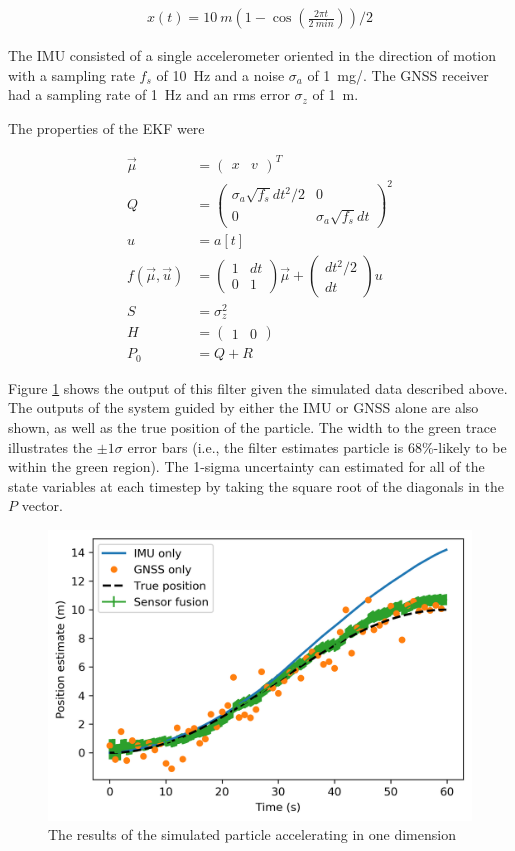 \documentclass[10pt]{article}
\begin{document}
\begin{align}
  x(t) = \SI{10}{m}\left(1 - \cos\left( \frac{2\pi t}{\SI{2}{min}}\right)\right) / 2
\end{align}

The IMU consisted of a single accelerometer oriented in the direction of motion with a sampling rate $f_s$ of \SI{10}{Hz} and a noise $\sigma_a$ of \SI{1}{mg/}. The GNSS receiver had a sampling rate of \SI{1}{Hz} and an rms error $\sigma_z$ of \SI{1}{m}.

The properties of the EKF were

\begin{align}
\vec{\mu} &= \begin{pmatrix} x & v \end{pmatrix}^T \\
  Q & = \begin{pmatrix}
    \sigma_a \sqrt{f_s} dt^2/2 & 0 \\
    0 & \sigma_a \sqrt{f_s} dt
  \end{pmatrix}^2 \\
  u &= a[t] \\
  f(\vec{\mu}, \vec{u}) &= \begin{pmatrix}
    1 & dt \\ 0 & 1
  \end{pmatrix} \vec{\mu} 
  + \begin{pmatrix} 
    dt^2/2 \\ dt
  \end{pmatrix} u
  \\
  S &= \sigma_z^2 \\ 
H &= \begin{pmatrix} 1 & 0 \end{pmatrix} \\
  P_0 &= Q + R
\end{align}

Figure \ref{fig:1d-accelerometer-results} shows the output of this filter given the simulated data described above. The outputs of the system guided by either the IMU or GNSS alone are also shown, as well as the true position of the particle. The width to the green trace illustrates the $\pm 1\sigma$ error bars (i.e., the filter estimates particle is 68\%-likely to be within the green region). The 1-sigma uncertainty can estimated for all of the state variables at each timestep by taking the square root of the diagonals in the $P$ vector. 

\begin{figure}[hbt]
  \centering
  \includegraphics[width=.5\textwidth]{../images/1d-accelerometer-simulation.png}
  \caption{\label{fig:1d-accelerometer-results} The results of the simulated particle accelerating in one dimension}
\end{figure}
\end{document}
